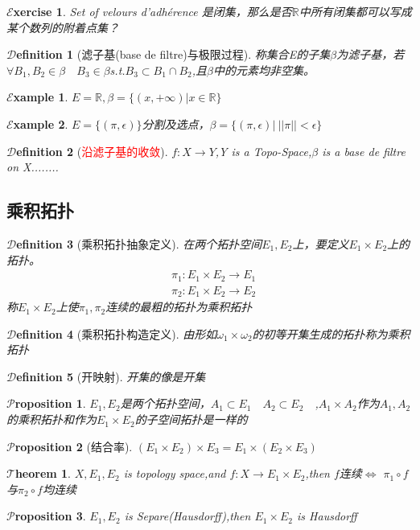 \documentclass[hyperfer,UTF8,a4paper,12pt]{article}
\theoremstyle{plain}
\newtheorem{Thm}{$\mathcal{T}$heorem}
\newtheorem*{Prop}{$\mathcal{P}$roposition}
\newtheorem{Def}{{$\mathcal{D}$efinition}}[section]
\newtheorem*{Example}{$\mathcal{E}$xample}
\newtheorem*{Exercise}{$\mathcal{E}$xercise}
\begin{document}
\begin{Exercise}
	Set of velours d'adhérence 是闭集，那么是否$ \mathbb{R} $中所有闭集都可以写成某个数列的附着点集？
\end{Exercise}

\begin{Def}[滤子基(base de filtre)与极限过程]
	称集合E的子集$ \beta $为滤子基，若$ \forall B_1,B_2\in\beta\quad B_3\in\beta $s.t.$ B_3\subset B_1\cap B_2 $,且$ \beta $中的元素均非空集。
\end{Def}
\begin{Example}
	$ E=\mathbb{R} ,\beta=\{ (x,+\infty)|x\in\mathbb{R} \}$
\end{Example}
\begin{Example}
		$ E=\{(\pi,\epsilon)\} $分割及选点，$ \beta=\{(\pi,\epsilon)|\ ||\pi||<\epsilon  \} $
\end{Example}

\begin{Def}[\textcolor{red}{沿滤子基的收敛}]
	$ f:X\to Y $,Y is a Topo-Space,$ \beta $ is a base de filtre on X........
\end{Def}


\subsection{乘积拓扑}
\begin{Def}[乘积拓扑抽象定义]
	在两个拓扑空间$ E_1,E_2 $上，要定义$ E_1\times E_2 $上的拓扑。
	\begin{align*}
		&\pi_1: E_1\times E_2 \to E_1 \\
		&\pi_2: E_1\times E_2 \to E_2
	\end{align*}
	称$ E_1\times E_2 $上使$\pi_1,\pi_2$连续的最粗的拓扑为乘积拓扑
\end{Def}
\begin{Def}[乘积拓扑构造定义]
	由形如$ \omega_1\times\omega_2 $的初等开集生成的拓扑称为乘积拓扑
\end{Def}
\begin{Def}[开映射]
	开集的像是开集
\end{Def}
\begin{Prop}
	$ E_1,E_2 $是两个拓扑空间，$ A_1\subset E_1\quad A_2\subset E_2 \quad$,$A_1\times A_2$作为$ A_1,A_2 $的乘积拓扑和作为$ E_1\times E_2 $的子空间拓扑是一样的
\end{Prop}
\begin{Prop}[结合率]
	$ (E_1\times E_2)\times E_3=E_1\times(E_2\times E_3) $
\end{Prop}
\begin{Thm}
	$ X,E_1,E_2 $ is topology space,and $ f:X\to E_1\times E_2 $,then $ f $连续$ \Leftrightarrow $ $\pi_1\circ f  $与$\pi_2\circ f$均连续 
\end{Thm}
\begin{Prop}
	$ E_1,E_2 $ is Separe(Hausdorff),then $E_1\times E_2$ is Hausdorff
\end{Prop}
\end{document}
